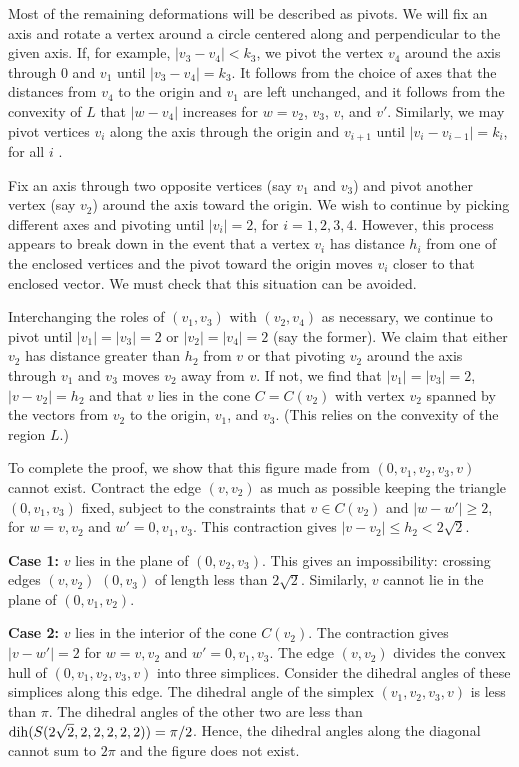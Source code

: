 Most of the remaining deformations will be described as pivots.  We
will fix an axis and rotate a vertex around a circle centered along
and perpendicular to the given axis.  If, for example, $|v_3-v_4|<k_3$,
we pivot the vertex $v_4$
around the axis through $0$ and $v_1$ until $|v_3-v_4|=k_3$.
It
follows from the choice of axes that the distances from $v_4$ to the origin
and $v_1$ are left unchanged, and it follows from the convexity of $L$
that $|w-v_4|$ increases for $w=v_2$, $v_3$, $v$, and $v'$.
    Similarly,
we may pivot vertices $v_i$ along the axis
through the origin and $v_{i+1}$ until $|v_i-v_{i-1}|=k_i$, for all $i$
.

Fix an axis through two opposite vertices (say $v_1$ and $v_3$)
and pivot another  vertex (say $v_2$) around the axis toward the
origin.  We wish to continue by picking different axes and
pivoting until $|v_i|=2$, for $i=1,2,3,4$.  However,
this process appears to break down in the event that
a vertex $v_i$ has distance $h_i$ from one of the enclosed
vertices and the pivot toward the origin moves $v_i$ closer
to that enclosed vector.  We must check that this situation can
be avoided.

Interchanging the roles of $(v_1,v_3)$ with
$(v_2,v_4)$ as necessary, we continue to pivot until
$|v_1|=|v_3|=2$ or $|v_2|=|v_4|=2$ (say the former).
We claim that either $v_2$ has distance greater than $h_2$ from
$v$ or that pivoting $v_2$ around
the axis through $v_1$ and $v_3$ moves $v_2$
away from $v$.  If not, we find that
$|v_1|=|v_3|=2$, $|v-v_2|=h_2$ and that $v$ lies in the
cone $C=C(v_2)$ with vertex $v_2$ spanned by the vectors
from $v_2$ to the origin, $v_1$, and $v_3$. (This
relies on the convexity of the region $L$.)

To complete the proof, we show that this figure made from $(0,v_1,v_2,v_3,v)$
cannot exist.  
Contract the edge $(v,v_2)$ as much as possible keeping 
the triangle $(0,v_1,v_3)$
fixed, subject to the constraints that $v\in C(v_2)$ and $|w-w'|\ge2$,
for $w=v,v_2$ and  $w'=0,v_1,v_3$.  This contraction gives
$|v-v_2|\le h_2<2\sqrt{2}$.

{\bf Case 1:} $v$ lies in the plane of $(0,v_2,v_3)$.  This gives an
impossibility: crossing edges $(v,v_2)$
$(0,v_3)$ of length
less than $2\sqrt{2}$.  Similarly, $v$ cannot lie in the plane of $(0,v_1,v_2)$.

{\bf Case 2:} $v$ lies in the interior of the cone $C(v_2)$. The contraction
gives
$|v-w'|=2$ for $w=v,v_2$ and $w'=0,v_1,v_3$.
The edge $(v,v_2)$ divides the
convex hull of  $(0,v_1,v_2,v_3,v)$
into three simplices.
Consider the dihedral angles of these simplices along
this edge. The dihedral angle of the simplex
$(v_1,v_2,v_3,v)$ is less than $\pi$.
The dihedral angles of the other two are less than
$\operatorname{dih}(S(2\sqrt{2},2,2,2,2,2))=\pi/2$.  Hence, the dihedral
angles along the diagonal cannot sum to $2\pi$
and the figure does not exist.

